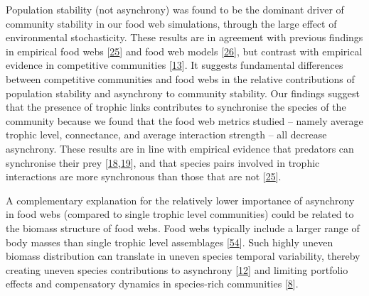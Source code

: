 \documentclass[
]{article}
\begin{document}
Population stability (not asynchrony) was found to be the dominant driver of
community stability in our food web simulations, through the large effect of
environmental stochasticity. These results are in agreement with previous
findings in empirical food webs {[}\protect\hyperlink{ref-danet_species_2021}{25}{]} and food web models
{[}\protect\hyperlink{ref-eschenbrenner_diversity_2023}{26}{]}, but contrast with empirical evidence in
competitive communities {[}\protect\hyperlink{ref-olivier_urbanization_2020}{13}{]}. It suggests fundamental
differences between competitive communities and food webs in the relative
contributions of population stability and asynchrony to community stability.
Our findings suggest that the presence of trophic links contributes to
synchronise the species of the community because we found that the food web
metrics studied -- namely average trophic level, connectance, and average
interaction strength -- all decrease asynchrony. These results are in line with
empirical evidence that predators can synchronise their prey
{[}\protect\hyperlink{ref-raimondo_interspecific_2004}{18},\protect\hyperlink{ref-korpimaki_predatorinduced_2005}{19}{]}, and that
species pairs involved in trophic interactions are more synchronous than those
that are not {[}\protect\hyperlink{ref-danet_species_2021}{25}{]}.

A complementary explanation for the relatively lower importance of asynchrony
in food webs (compared to single trophic level communities) could be related to
the biomass structure of food webs. Food webs typically include a larger range
of body masses than single trophic level assemblages {[}\protect\hyperlink{ref-brose_predator_2019}{54}{]}.
Such highly uneven biomass distribution can translate in uneven species
temporal variability, thereby creating uneven species contributions to
asynchrony {[}\protect\hyperlink{ref-thibaut_understanding_2013}{12}{]} and limiting portfolio effects and
compensatory dynamics in species-rich communities {[}\protect\hyperlink{ref-zhao_biodiversity_2022}{8}{]}.
\end{document}
